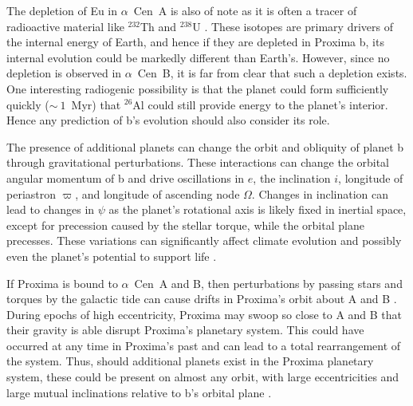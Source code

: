 \documentclass[preprint,12pt]{aastex}
\def\eg{{\it e.g.\ }}
\def\acen{{$\alpha$~Cen}}
\begin{document}
The depletion of Eu in \acen~A is also of note as it is often a tracer
of radioactive material like $^{232}$Th and $^{238}$U
\citep{Young14}. These isotopes are primary drivers of the internal
energy of Earth, and hence if they are depleted in Proxima b, its
internal evolution could be markedly different than Earth's. However,
since no depletion is observed in \acen~B, it is far from clear that
such a depletion exists. One interesting radiogenic possibility is
that the planet could form sufficiently quickly ($\sim~1$~Myr) that
$^{26}$Al could still provide energy to the planet's interior. Hence any
prediction of b's evolution should also consider its role.

The presence of additional planets can change the orbit and obliquity
of planet b through gravitational perturbations. These interactions
can change the orbital angular momentum of b and drive oscillations in
$e$, the inclination $i$, longitude of periastron $\varpi$, and
longitude of ascending node $\Omega$. Changes in inclination can lead
to changes in $\psi$ as the planet's rotational axis is likely fixed
in inertial space, except for precession caused by the stellar torque,
while the orbital plane precesses. These variations can significantly
affect climate evolution and possibly even the planet's potential to
support life \citep{Armstrong14}. 

If Proxima is bound to \acen~A and B, then perturbations by passing
stars and torques by the galactic tide can cause drifts in Proxima's
orbit about A and B \citep{Kaib13}. During epochs of high
eccentricity, Proxima may swoop so close to A and B that their gravity
is able disrupt Proxima's planetary system. This could have occurred
at any time in Proxima's past and can lead to a total rearrangement of
the system. Thus, should additional planets exist in the Proxima
planetary system, these could be present on almost any orbit, with
large eccentricities and large mutual inclinations relative to b's
orbital plane \citep[\eg][]{Barnes11}.
\end{document}
